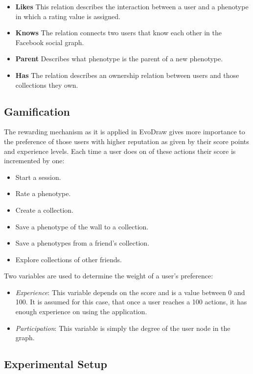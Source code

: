 \begin{itemize}
\item {\bf Likes} This relation describes the interaction between a user and
a phenotype in which a rating value is assigned.

\item {\bf Knows} The relation connects two users that know each
other in the Facebook social graph. 

\item {\bf Parent} Describes what phenotype is the parent of a new
  phenotype. 

\item {\bf Has} The relation describes an ownership relation between users and
those collections they own. 
\end{itemize}

\subsection{Gamification}
The rewarding mechanism as it is applied in EvoDraw gives more importance 
to the preference of those users with higher reputation
as given by their score points and experience levels.  
Each time a user does on of these actions their score is incremented by one:
\begin{itemize}
\item Start a session.
\item Rate a phenotype.
\item Create a collection.
\item Save a phenotype of the wall to a collection.
\item Save a phenotypes from a friend's collection.
\item Explore collections of other friends.
\end{itemize}

Two variables are used to determine the weight of a user's preference:
\begin{itemize}
\item {\em Experience}: This variable depends on the score and is a value 
between 0 and 100. It is assumed for this case, that once a user
reaches a 100 actions, it has enough experience on using the application.   

\item {\em Participation}: This variable is simply the degree of the user node 
in the graph.    
\end{itemize}

\subsection{Experimental Setup}
\label{sec:experiments}
 
